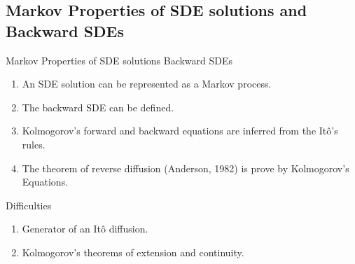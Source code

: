 \subsection{Markov Properties of SDE solutions and Backward SDEs}
\begin{frame}{Markov Properties of SDE solutions Backward SDEs}

\begin{enumerate}
    \item An SDE solution can be represented as a Markov process.
    \item The backward SDE can be defined.
    \item Kolmogorov's forward and backward equations are inferred from the Itô's rules.
    \item The theorem of reverse diffusion (Anderson, 1982) is prove by Kolmogorov's Equations.
\end{enumerate}
\end{frame}

\begin{frame}{Difficulties}
    \begin{enumerate}
    \item Generator of an Itô diffusion.
        \item Kolmogorov's theorems of extension and continuity.
    \end{enumerate}
\end{frame}